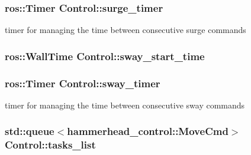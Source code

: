\subsubsection[{\texorpdfstring{surge\+\_\+timer}{surge_timer}}]{\setlength{\rightskip}{0pt plus 5cm}ros\+::\+Timer Control\+::surge\+\_\+timer\hspace{0.3cm}{\ttfamily [private]}}\hypertarget{classControl_a01b569ce4cb201b75b1304800c5957f1}{}\label{classControl_a01b569ce4cb201b75b1304800c5957f1}


timer for managing the time between consecutive surge commands 

\subsubsection[{\texorpdfstring{sway\+\_\+start\+\_\+time}{sway_start_time}}]{\setlength{\rightskip}{0pt plus 5cm}ros\+::\+Wall\+Time Control\+::sway\+\_\+start\+\_\+time\hspace{0.3cm}{\ttfamily [private]}}\hypertarget{classControl_a1d05716c729b56329776ab242498d2dd}{}\label{classControl_a1d05716c729b56329776ab242498d2dd}
\subsubsection[{\texorpdfstring{sway\+\_\+timer}{sway_timer}}]{\setlength{\rightskip}{0pt plus 5cm}ros\+::\+Timer Control\+::sway\+\_\+timer\hspace{0.3cm}{\ttfamily [private]}}\hypertarget{classControl_a5b838b01bae62bcd23ddb8089a73b217}{}\label{classControl_a5b838b01bae62bcd23ddb8089a73b217}


timer for managing the time between consecutive sway commands 

\subsubsection[{\texorpdfstring{tasks\+\_\+list}{tasks_list}}]{\setlength{\rightskip}{0pt plus 5cm}std\+::queue$<$hammerhead\+\_\+control\+::\+Move\+Cmd$>$ Control\+::tasks\+\_\+list\hspace{0.3cm}{\ttfamily [private]}}\hypertarget{classControl_a8253a25dca4732520650a20d04bc444c}{}\label{classControl_a8253a25dca4732520650a20d04bc444c}


